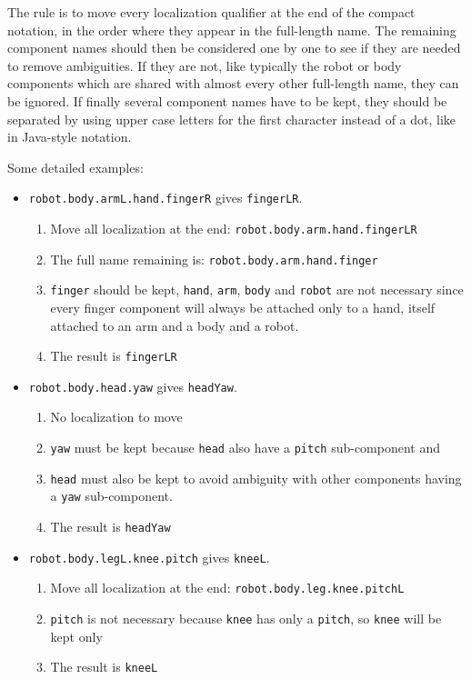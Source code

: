 The rule is to move every localization qualifier at the end of the compact
notation, in the order where they appear in the full-length name. The
remaining component names should then be considered one by one to see if
they are needed to remove ambiguities. If they are not, like typically the
robot or body components which are shared with almost every other
full-length name, they can be ignored. If finally several component names
have to be kept, they should be separated by using upper case letters for
the first character instead of a dot, like in Java-style notation.

Some detailed examples:

\begin{itemize}

\item \lstinline{robot.body.armL.hand.fingerR} gives \lstinline{fingerLR}.
  \begin{enumerate}
  \item Move all localization at the end:
    \lstinline{robot.body.arm.hand.fingerLR}
  \item The full name remaining is: \lstinline{robot.body.arm.hand.finger}
  \item \lstinline{finger} should be kept, \lstinline{hand},
    \lstinline{arm}, \lstinline{body} and \lstinline{robot} are not
    necessary since every finger component will always be attached only to a
    hand, itself attached to an arm and a body and a robot.
  \item The result is \lstinline{fingerLR}
  \end{enumerate}

\item \lstinline{robot.body.head.yaw} gives \lstinline{headYaw}.
  \begin{enumerate}
  \item No localization to move
  \item \lstinline{yaw} must be kept because \lstinline{head} also have a
    \lstinline{pitch} sub-component and
  \item \lstinline{head} must also be kept to avoid ambiguity with other
    components having a \lstinline{yaw} sub-component.
  \item The result is \lstinline{headYaw}
  \end{enumerate}

\item \lstinline{robot.body.legL.knee.pitch} gives \lstinline{kneeL}.
  \begin{enumerate}
  \item Move all localization at the end:
    \lstinline{robot.body.leg.knee.pitchL}
  \item \lstinline{pitch} is not necessary because \lstinline{knee} has only
    a \lstinline{pitch}, so \lstinline{knee} will be kept only
  \item The result is \lstinline{kneeL}
  \end{enumerate}
\end{itemize}

